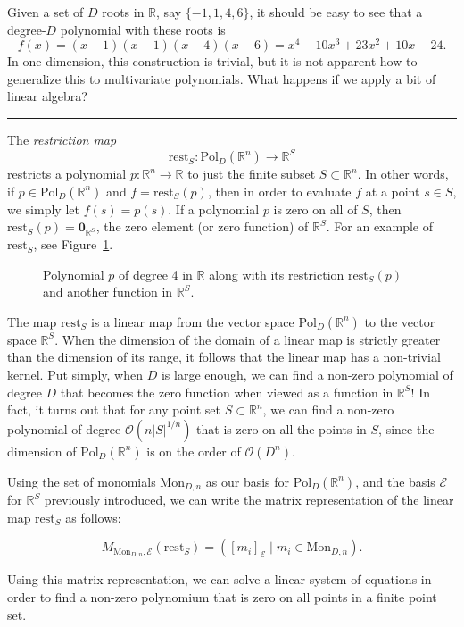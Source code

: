 \documentclass[article,oneside,a4paper]{memoir}
\newcommand{\rfig}[1]{Figure~\ref{fig:#1}}
\newcommand{\BigO}{\mathcal{O}}
\newcommand{\reals}{\mathbb{R}}
\newcommand{\Pol}[2]{\mathrm{Pol}_#1(\reals^#2)}
\newcommand{\PolDn}{\Pol Dn}
\newcommand{\Mon}[2]{\mathrm{Mon}_{#1,#2}}
\newcommand{\MonDn}{\Mon Dn}
\newcommand{\StoR}{\reals^S}
\newcommand{\rest}{\mathrm{rest}}
\newcommand{\restS}{\rest_S}
\newcommand{\StandardBasis}{\mathcal{E}}
\newcommand{\Ssz}{|S|}
\newcommand{\V}[1]{\mathbf{#1}}
\begin{document}
Given a set of $D$ roots in $\reals$,
say $\{-1, 1, 4, 6\}$,
it should be easy to see that a degree-$D$ polynomial with these roots is
\[f(x) = (x + 1)(x - 1)(x - 4)(x - 6) = x^4 - 10 x^3 + 23 x^2 + 10 x - 24.\]
In one dimension, this construction is trivial,
but it is not apparent how to generalize this to multivariate polynomials.
What happens if we apply a bit of linear algebra?

\fancybreak{* * *}

The \emph{restriction map}
\[\restS : \PolDn \to \StoR\]
restricts a polynomial $p : \reals^n \to \reals$ to just the finite subset
$S \subset \reals^n$. In other words, if $p \in \PolDn$
and $f = \restS(p)$, then in order to evaluate $f$ at a point $s \in S$,
we simply let $f(s) = p(s)$. If a polynomial $p$ is zero on all of $S$,
then $\restS(p) = \V 0_{\StoR}$, the zero element (or zero function) of $\StoR$.
For an example of $\restS$, see \rfig{rest}.

\begin{figure}

\caption{
  Polynomial $p$ of degree 4 in $\reals$ along with its restriction
  $\restS(p)$ and another function in $\StoR$.
}
\label{fig:rest}
\end{figure}

The map $\restS$ is a linear map from the vector space $\PolDn$ %
to the vector space $\StoR$. %
When the dimension of the domain of a linear map is strictly greater than the
dimension of its range, it follows that the linear map has a non-trivial kernel.
Put simply, when $D$ is large enough, we can find a non-zero polynomial of
degree $D$ that becomes the zero function when viewed as a function in $\StoR$!
In fact, it turns out that for any point set $S \subset \reals^n$,
we can find a non-zero polynomial of degree $\BigO(n\Ssz^{1/n})$
that is zero on all the points in $S$,
since the dimension of $\PolDn$ is on the order of $\BigO(D^n)$.

Using the set of monomials $\MonDn$ as our basis for $\PolDn$,
and the basis $\StandardBasis$ for $\StoR$ previously introduced,
we can write the matrix representation of the linear map $\restS$ as follows:

\[
  M_{\MonDn, \StandardBasis}(\restS)
  = \left( [m_i]_\StandardBasis \mid m_i \in \MonDn \right).
\]

Using this matrix representation, we can solve a linear system of equations
in order to find a non-zero polynomium that is zero on all points in a finite point set.
\end{document}
